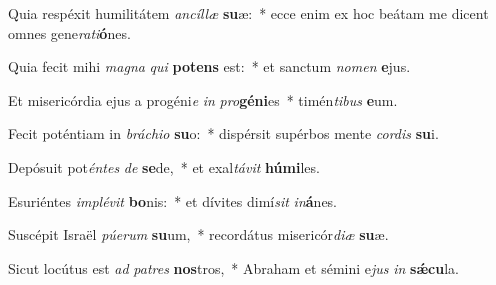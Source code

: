 \item Quia respéxit humilitátem \textit{an}\textit{cíl}\textit{læ} \textbf{su}æ:~* ecce enim ex hoc beátam me dicent omnes gene\textit{ra}\textit{ti}\textbf{ó}nes.
\item Quia fecit mihi \textit{ma}\textit{gna} \textit{qui} \textbf{pot}\textbf{ens} est:~* et sanctum \textit{no}\textit{men} \textbf{e}jus.
\item Et misericórdia ejus a progéni\textit{e} \textit{in} \textit{pro}\textbf{gé}\textbf{ni}es~* timén\textit{ti}\textit{bus} \textbf{e}um.
\item Fecit poténtiam in \textit{brá}\textit{chi}\textit{o} \textbf{su}o:~* dispérsit supérbos mente \textit{cor}\textit{dis} \textbf{su}i.
\item Depósuit pot\textit{én}\textit{tes} \textit{de} \textbf{se}de,~* et exal\textit{tá}\textit{vit} \textbf{hú}\textbf{mi}les.
\item Esuriéntes \textit{im}\textit{plé}\textit{vit} \textbf{bo}nis:~* et dívites dimí\textit{sit} \textit{in}\textbf{á}nes.
\item Suscépit Israël \textit{pú}\textit{e}\textit{rum} \textbf{su}um,~* recordátus misericór\textit{di}\textit{æ} \textbf{su}æ.
\item Sicut locútus est \textit{ad} \textit{pa}\textit{tres} \textbf{nos}tros,~* Abraham et sémini e\textit{jus} \textit{in} \textbf{sǽ}\textbf{cu}la.
